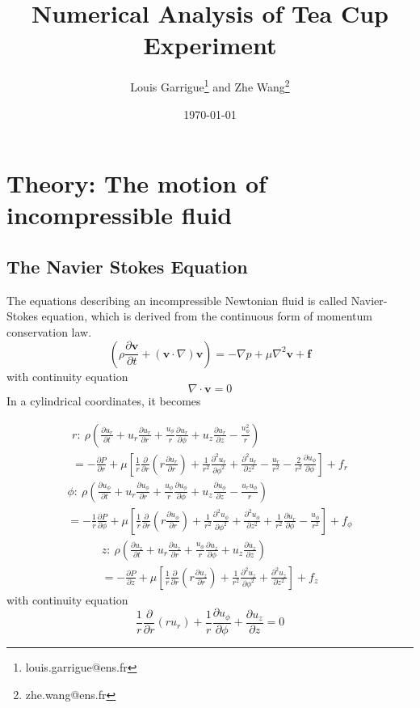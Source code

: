 \documentclass[12pt]{article}
\newcommand{\f}{\phi}
\newcommand{\ur}{u_r}
\newcommand{\uf}{u_\f}
\newcommand{\uz}{u_z}
\newcommand{\deriv}[2]{\frac{\partial #1}{\partial #2}}
\newcommand{\deris}[2]{\frac{\partial^2 #1}{\partial #2^2}}
\newcommand{\mf}[1]{\mathbf{#1}}
\newcommand{\beq}{\begin{equation}}
\newcommand{\eeq}{\end{equation}}
\begin{document}
\title{Numerical Analysis of Tea Cup Experiment}
\author{Louis Garrigue\footnote{louis.garrigue@ens.fr} and Zhe Wang\footnote{zhe.wang@ens.fr}}
\date{\today}
\maketitle

\section{Theory: The motion of incompressible fluid}
\subsection{The Navier Stokes Equation}
The equations describing an incompressible Newtonian fluid is called Navier-Stokes equation, which is derived from the continuous form of momentum conservation law.
\beq
\left(\rho\deriv{\mf{v}}{t}+(\mf{v}\cdot\nabla)\mf{v}\right)=-\nabla p+\mu\nabla^2\mf{v}+\mf{f}
\eeq
with continuity equation
\beq
\nabla\cdot\mf{v}=0
\eeq
In a cylindrical coordinates, it becomes


\begin{multline}
r:~\rho\left(\deriv{u_r}{t}+u_r\deriv{u_r}{r}+\frac{u_\f}{r}\deriv{u_r}{\f}+u_z\deriv{u_r}{z}-\frac{u_\f^2}{r}\right)\\
=-\deriv{P}{r}+\mu\left[\frac{1}{r}\deriv{}{r}(r\deriv{\ur}{r})+\frac{1}{r^2}\deris{\ur}{\f}+\deris{\ur}{z}-\frac{\ur}{r^2}-\frac{2}{r^2}\deriv{\uf}{\f}\right]+f_r
\end{multline}
\begin{multline}
\f:~\rho\left(\deriv{\uf}{t}+u_r\deriv{\uf}{r}+\frac{\uf}{r}\deriv{\uf}{\f}+\uz\deriv{\uf}{z}-\frac{\ur\uf}{r}\right)\\
=-\frac{1}{r}\deriv{P}{\f}+\mu\left[\frac{1}{r}\deriv{}{r}(r\deriv{\uf}{r})+\frac{1}{r^2}\deris{\uf}{\f}+\deris{\uf}{z}+\frac{1}{r^2}\deriv{\ur}{\f}-\frac{\uf}{r^2}\right]+f_\f
\end{multline}
\begin{multline}
z:~\rho\left(\deriv{\uz}{t}+u_r\deriv{\uz}{r}+\frac{\uf}{r}\deriv{\uz}{\f}+u_z\deriv{\uz}{z}\right)\\
=-\deriv{P}{z}+\mu\left[\frac{1}{r}\deriv{}{r}(r\deriv{\uz}{r})+\frac{1}{r^2}\deris{\uz}{\f}+\deris{\uz}{z}\right]+f_z
\end{multline}
with continuity equation
\beq
\frac{1}{r}\deriv{}{r}(r\ur)+\frac{1}{r}\deriv{\uf}{\f}+\deriv{\uz}{z}=0
\eeq

%
%
\end{document}
